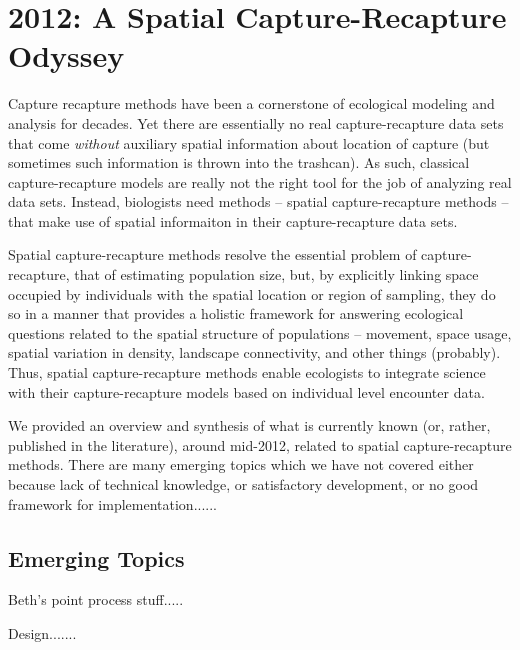 


\chapter{
 2012: A Spatial Capture-Recapture Odyssey
 }

\label{chapt.final}

\vspace{0.3cm}


\vspace{2in}

Capture recapture methods have been a cornerstone of ecological
modeling and analysis for decades.  Yet there are essentially no real
capture-recapture data sets that come {\it without} auxiliary spatial
information about location of capture (but sometimes such information
is thrown into the trashcan).  As such, classical capture-recapture
models are really not the right tool for the job of analyzing real
data sets. Instead, biologists need methods -- spatial
capture-recapture methods -- that make use of spatial
informaiton in their capture-recapture data sets. 

Spatial capture-recapture methods resolve the essential problem of
capture-recapture, that of estimating population size, but, by
explicitly linking space occupied by individuals with the spatial
location or region of sampling, they do so in a manner that provides a
holistic framework for answering ecological questions related to the
spatial structure of populations -- movement, space usage, spatial
variation in density, landscape connectivity, and other things
(probably).  Thus, spatial capture-recapture methods enable ecologists
to integrate science with their capture-recapture models based on
individual level encounter data.

We provided an overview and synthesis of what is currently known (or,
rather, published in the literature),
around mid-2012, related to spatial capture-recapture methods. There
are many emerging topics which we have not covered either because lack
of technical knowledge, or satisfactory development, or no good
framework for implementation......

\section{Emerging Topics}

Beth's point process stuff.....

Design.......

